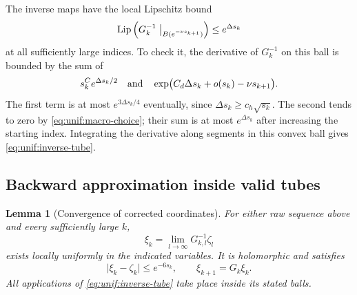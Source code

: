 \documentclass[11pt]{article}
\newtheorem{lemma}[theorem]{Lemma}
\theoremstyle{definition}
\theoremstyle{remark}
\DeclareMathOperator{\Lip}{Lip}
\newcommand{\abs}[1]{\lvert#1\rvert}
\numberwithin{equation}{section}
\begin{document}
The inverse maps have the local Lipschitz bound
\begin{equation}
 \Lip\left(G_k^{-1}\bigm|_{B(e^{-\nu s_{k+1}})}\right)
 \le e^{\Delta s_k}
 \label{eq:unif:inverse-tube}
\end{equation}
at all sufficiently large indices.  To check it, the derivative of
$G_k^{-1}$ on this ball is bounded by the sum of
\[
 s_k^C e^{\Delta s_k/2}
 \quad\hbox{and}\quad
 \exp\bigl(C_d\Delta s_k+o(s_k)-\nu s_{k+1}\bigr).
\]
The first term is at most $e^{3\Delta s_k/4}$ eventually, since
$\Delta s_k\ge c_h\sqrt{s_k}$.  The second tends to zero by
\eqref{eq:unif:macro-choice}; their sum is at most
$e^{\Delta s_k}$ after increasing the starting index.  Integrating
the derivative along segments in this convex ball gives
\eqref{eq:unif:inverse-tube}.

\subsection{Backward approximation inside valid tubes}

\begin{lemma}[Convergence of corrected coordinates]
\label{lem:unif:backward-limit}
For either raw sequence above and every sufficiently large $k$,
\[
 \xi_k=\lim_{l\to\infty}G_{k,l}^{-1}\zeta_l
\]
exists locally uniformly in the indicated variables.  It is
holomorphic and satisfies
\begin{equation}
 \abs{\xi_k-\zeta_k}\le e^{-6s_k},\qquad
 \xi_{k+1}=G_k\xi_k.
 \label{eq:unif:shadow}
\end{equation}
All applications of \eqref{eq:unif:inverse-tube} take place inside
its stated balls.
\end{lemma}
\end{document}
